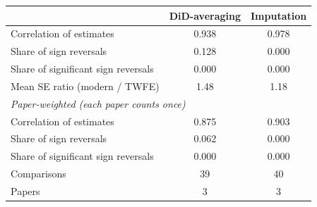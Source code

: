\begin{tabular}{lcc}
\toprule
 & DiD-averaging & Imputation \\
\midrule
Correlation of estimates & 0.938 & 0.978 \\
Share of sign reversals & 0.128 & 0.000 \\
Share of significant sign reversals & 0.000 & 0.000 \\
Mean SE ratio (modern / TWFE) & 1.48 & 1.18 \\
\midrule
\multicolumn{3}{l}{\emph{Paper-weighted (each paper counts once)}} \\
Correlation of estimates & 0.875 & 0.903 \\
Share of sign reversals & 0.062 & 0.000 \\
Share of significant sign reversals & 0.000 & 0.000 \\
\midrule
Comparisons & 39 & 40 \\
Papers & 3 & 3 \\
\bottomrule
\end{tabular}
